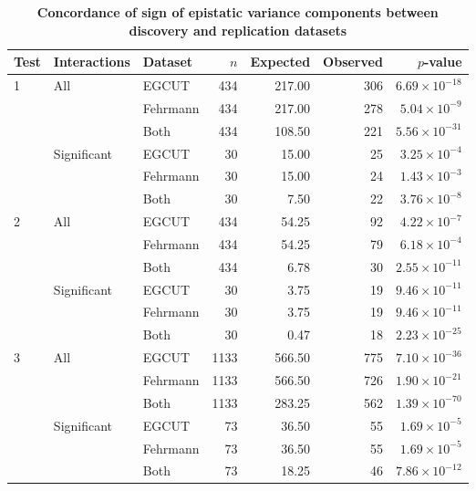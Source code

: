 \documentclass{article}
\begin{document}
\begin{table}[ht]
\begin{threeparttable}
\caption{\textbf{Concordance of sign of epistatic variance components between discovery and replication datasets}}
\label{tab:sign}
\begin{tabular}{lllrrrr}

  \hline
Test & Interactions\tnote{a} & Dataset & $n$\tnote{b} & Expected\tnote{c} & Observed\tnote{d} & $p$-value \\
  \hline
1\tnote{e} & All & EGCUT & 434 & 217.00 & 306 & $6.69 \times 10^{-18}$ \\
&  & Fehrmann & 434 & 217.00 & 278 & $5.04 \times 10^{-9}$ \\
&  & Both & 434 & 108.50 & 221 & $5.56 \times 10^{-31}$ \\
& Significant & EGCUT & 30 & 15.00 & 25 & $3.25 \times 10^{-4}$ \\
&  & Fehrmann & 30 & 15.00 & 24 & $1.43 \times 10^{-3}$ \\
&  & Both & 30 & 7.50 & 22 & $3.76 \times 10^{-8}$ \\
  \hline
2\tnote{f} & All & EGCUT & 434 & 54.25 & 92 & $4.22 \times 10^{-7}$ \\
&  & Fehrmann & 434 & 54.25 & 79 & $6.18 \times 10^{-4}$ \\
&  & Both & 434 & 6.78 & 30 & $2.55 \times 10^{-11}$ \\
& Significant & EGCUT & 30 & 3.75 & 19 & $9.46 \times 10^{-11}$ \\
&  & Fehrmann & 30 & 3.75 & 19 & $9.46 \times 10^{-11}$ \\
&  & Both & 30 & 0.47 & 18 & $2.23 \times 10^{-25}$ \\
  \hline
3\tnote{g} & All & EGCUT & 1133 & 566.50 & 775 & $7.10 \times 10^{-36}$ \\
&  & Fehrmann & 1133 & 566.50 & 726 & $1.90 \times 10^{-21}$ \\
&  & Both & 1133 & 283.25 & 562 & $1.39 \times 10^{-70}$ \\
& Significant & EGCUT & 73 & 36.50 & 55 & $1.69 \times 10^{-5}$ \\
&  & Fehrmann & 73 & 36.50 & 55 & $1.69 \times 10^{-5}$ \\
&  & Both & 73 & 18.25 & 46 & $7.86 \times 10^{-12}$ \\
   \hline
\end{tabular}


\end{threeparttable}
\end{table}
\end{document}
